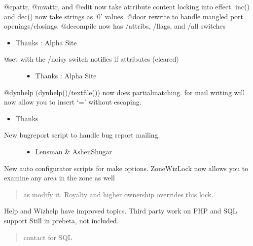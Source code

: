 \documentclass[letterpaper,10pt,english]{sphinxmanual}
\begin{document}
\sphinxAtStartPar
@cpattr, @mvattr, and @edit now take attribute content locking into effect.
inc() and dec() now take strings as ‘0’ values.
@door rewrite to handle mangled port openings/closings.
@decompile now has /attribs, /flags, and /all switches
\begin{itemize}
\item {} 
\sphinxAtStartPar
Thanks : Alpha Site

\end{itemize}
\begin{description}
\item[{@set with the /noisy switch notifies if attributes (cleared)}] \leavevmode\begin{itemize}
\item {} 
\sphinxAtStartPar
Thanks : Alpha Site

\end{itemize}

\end{description}

\sphinxAtStartPar
@dynhelp (dynhelp()/textfile()) now does partial\sphinxhyphen{}matching.
\sphinxhyphen{} for mail writing will now allow you to insert ‘=’ without escaping.
\begin{itemize}
\item {} 
\sphinxAtStartPar
Thanks 

\end{itemize}
\begin{description}
\item[{New bugreport script to handle bug report mailing.}] \leavevmode\begin{itemize}
\item {} 
\sphinxAtStartPar
Lensman \& Ashen\sphinxhyphen{}Shugar

\end{itemize}

\end{description}

\sphinxAtStartPar
New auto configurator scripts for make options.
ZoneWizLock now allows you to examine any area in the zone as well
\begin{quote}

\sphinxAtStartPar
as modify it.  Royalty and higher ownership overrides this lock.
\end{quote}

\sphinxAtStartPar
Help and Wizhelp have improved topics.
Third party work on PHP and SQL support \sphinxhyphen{} Still in pre\sphinxhyphen{}beta, not included.
\begin{quote}

\sphinxAtStartPar
contact  for SQL
\end{quote}
\end{document}
